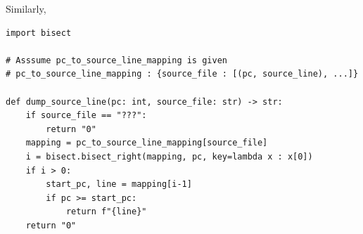 Similarly, 

\begin{center}
\begin{minipage}{\textwidth}
\begin{lstlisting}
import bisect

# Asssume pc_to_source_line_mapping is given
# pc_to_source_line_mapping : {source_file : [(pc, source_line), ...]}

def dump_source_line(pc: int, source_file: str) -> str:
    if source_file == "???":
        return "0"
    mapping = pc_to_source_line_mapping[source_file]
    i = bisect.bisect_right(mapping, pc, key=lambda x : x[0])
    if i > 0:
        start_pc, line = mapping[i-1]
        if pc >= start_pc:
            return f"{line}"
    return "0"

\end{lstlisting}
\end{minipage}
\end{center}